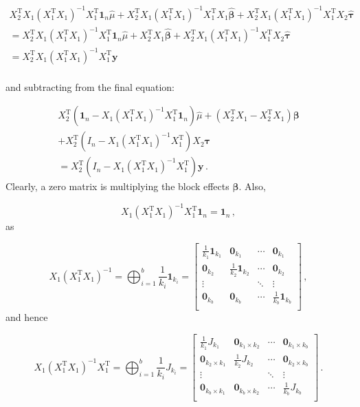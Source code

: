 \documentclass[
]{book}
\theoremstyle{definition}
\theoremstyle{definition}
\theoremstyle{definition}
\theoremstyle{definition}
\theoremstyle{remark}
\begin{document}
\begin{multline}
X_2^{\mathrm{T}}X_1(X_1^{\mathrm{T}}X_1)^{-1}X_1^{\mathrm{T}}\boldsymbol{1}_n\hat{\mu} + X_2^{\mathrm{T}}X_1(X_1^{\mathrm{T}}X_1)^{-1}X_1^{\mathrm{T}}X_1\hat{\boldsymbol{\beta}} + X_2^{\mathrm{T}}X_1(X_1^{\mathrm{T}}X_1)^{-1}X_1^{\mathrm{T}}X_2\hat{\boldsymbol{\tau}} \\
 = X_2^{\mathrm{T}}X_1(X_1^{\mathrm{T}}X_1)^{-1}X_1^{\mathrm{T}}\boldsymbol{1}_n\hat{\mu} + X_2^{\mathrm{T}}X_1\hat{\boldsymbol{\beta}} + X_2^{\mathrm{T}}X_1(X_1^{\mathrm{T}}X_1)^{-1}X_1^{\mathrm{T}}X_2\hat{\boldsymbol{\tau}} \\
 = X_2^{\mathrm{T}}X_1(X_1^{\mathrm{T}}X_1)^{-1}X_1^{\mathrm{T}}\boldsymbol{y}\\
\end{multline}

and subtracting from the final equation:

\begin{multline}
X_2^{\mathrm{T}}\left(\boldsymbol{1}_n - X_1(X_1^{\mathrm{T}}X_1)^{-1}X_1^{\mathrm{T}}\boldsymbol{1}_n\right)\hat{\mu} + \left(X_2^{\mathrm{T}}X_1 - X_2^{\mathrm{T}}X_1\right)\boldsymbol{\beta} \\ + X_2^{\mathrm{T}}\left(I_n - X_1(X_1^{\mathrm{T}}X_1)^{-1}X_1^{\mathrm{T}}\right)X_2\boldsymbol{\tau}\\
= X_2^{\mathrm{T}}\left(I_n - X_1(X_1^{\mathrm{T}}X_1)^{-1}X_1^{\mathrm{T}}\right)\boldsymbol{y}\,.
\end{multline}
Clearly, a zero matrix is multiplying the block effects \(\boldsymbol{\beta}\). Also,

\[
X_1(X_1^{\mathrm{T}}X_1)^{-1}X_1^{\mathrm{T}}\boldsymbol{1}_n = \boldsymbol{1}_n\,,
\]
as

\[
X_1(X_1^{\mathrm{T}}X_1)^{-1} = \bigoplus_{i = 1}^b \frac{1}{k_i}\boldsymbol{1}_{k_i} = \begin{bmatrix}
\frac{1}{k_1}\boldsymbol{1}_{k_1} & \boldsymbol{0}_{k_1} & \cdots &  \boldsymbol{0}_{k_1} \\
\boldsymbol{0}_{k_2} & \frac{1}{k_2}\boldsymbol{1}_{k_2} & \cdots &  \boldsymbol{0}_{k_2} \\
\vdots & & \ddots & \vdots \\
\boldsymbol{0}_{k_b} & \boldsymbol{0}_{k_b} & \cdots &  \frac{1}{k_b}\boldsymbol{1}_{k_b} \\
\end{bmatrix}\,,
\]
and hence

\[
X_1(X_1^{\mathrm{T}}X_1)^{-1}X_1^{\mathrm{T}} = \bigoplus_{i = 1}^b \frac{1}{k_i}J_{k_i} = \begin{bmatrix}
\frac{1}{k_1}J_{k_1} & \boldsymbol{0}_{k_1\times k_2} & \cdots &  \boldsymbol{0}_{k_1\times k_b} \\
\boldsymbol{0}_{k_2\times k_1} & \frac{1}{k_2}J_{k_2} & \cdots &  \boldsymbol{0}_{k_2\times k_b} \\
\vdots & & \ddots & \vdots \\
\boldsymbol{0}_{k_b\times k_1} & \boldsymbol{0}_{k_b\times k_2} & \cdots &  \frac{1}{k_b}J_{k_b} \\
\end{bmatrix}\,.
\]
\end{document}
